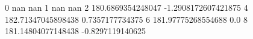 0 nan nan
1 nan nan
2 180.6869354248047 -1.2908172607421875
4 182.71347045898438 0.7357177734375
6 181.97775268554688 0.0
8 181.14804077148438 -0.8297119140625
